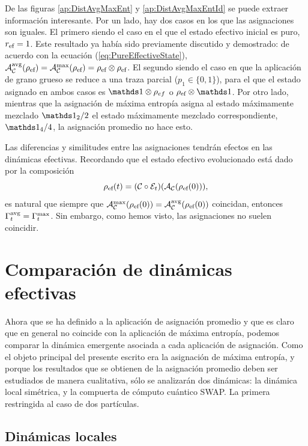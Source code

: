 De las figuras \ref{ap:DistAvgMaxEnt} y \ref{ap:DistAvgMaxEntId} se puede extraer información interesante. Por un lado, hay dos casos en los que las asignaciones son iguales. El primero siendo el caso en el que el estado efectivo inicial es puro, \ie{} $r_{\text{ef}}=1$. Este resultado ya había sido previamente discutido y demostrado: de acuerdo con la ecuación (\ref{eq:PureEffectiveState}), $\mathcal{A}_{\mathcal{C}}^{\text{avg}}(\rho_{\text{ef}})=\mathcal{A}_{\mathcal{C}}^{\max}(\rho_{\text{ef}})=\rho_{\text{ef}}\otimes\rho_{\text{ef}}$. El segundo siendo el caso en que la aplicación de grano grueso se reduce a una traza parcial ($p_{1}\in\{0,1\}$), para el que el estado asignado en ambos casos es $\Id\otimes\rho_{ef}$ o $\rho_{\ef}\otimes\Id$. Por otro lado, mientras que la asignación de máxima entropía asigna al estado máximamente mezclado $\Id_{2}/2$ el estado máximamente mezclado correspondiente, $\Id_{4}/4$, la asignación promedio no hace esto.

Las diferencias y similitudes entre las asignaciones tendrán efectos en las dinámicas efectivas. Recordando que el estado efectivo evolucionado está dado por la composición
\begin{equation}
    \rho_{\text{ef}}(t)=(\mathcal{C}\circ\mathcal{E}_{t})(\mathcal{A}_{\mathcal{C}}(\rho_{\text{ef}}(0))),\nonumber
\end{equation}
es natural que siempre que $\mathcal{A}_{\mathcal{C}}^{\max}(\rho_{\text{ef}}(0))=\mathcal{A}_{\mathcal{C}}^{\text{avg}}(\rho_{\text{ef}}(0))$ coincidan, entonces $\Gamma_{t}^{\text{avg}}=\Gamma_{t}^{\max}$. Sin embargo, como hemos visto, las asignaciones no suelen coincidir.


\section{Comparación de dinámicas efectivas}

Ahora que se ha definido a la aplicación de asignación promedio y que es claro que en general no coincide con la aplicación de máxima entropía, podemos comparar la dinámica emergente asociada a cada aplicación de asignación. Como el objeto principal del presente escrito era la asignación de máxima entropía, y porque los resultados que se obtienen de la asignación promedio deben ser estudiados de manera cualitativa, sólo se analizarán dos dinámicas: la dinámica local simétrica, y la compuerta de cómputo cuántico SWAP. La primera restringida al caso de dos partículas.

\subsection{Dinámicas locales}

